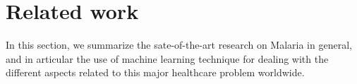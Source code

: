 \section{Related work}\label{related_work}
In this section, we summarize the sate-of-the-art research on Malaria in general, and in articular the
use of machine learning technique for dealing with the different aspects related to this major healthcare problem worldwide.
